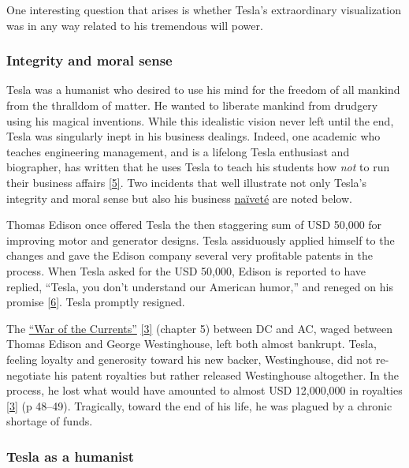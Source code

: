\documentclass[
  12pt,
  british,
  a4paper,
  rgb,
  dvipsnames,
  svgnames,
  hyphens]{article}
\begin{document}
One interesting question that arises is whether Tesla's extraordinary
visualization was in any way related to his tremendous will power.

\hypertarget{integrity-and-moral-sense}{%
\subsubsection{Integrity and moral
sense}\label{integrity-and-moral-sense}}

Tesla was a humanist who desired to use his mind for the freedom of all
mankind from the thralldom of matter. He wanted to liberate mankind from
drudgery using his magical inventions. While this idealistic vision
never left until the end, Tesla was singularly inept in his business
dealings. Indeed, one academic who teaches engineering management, and
is a lifelong Tesla enthusiast and biographer, has written that he uses
Tesla to teach his students how \emph{not} to run their business affairs
\protect\hyperlink{ref-lomas99}{{[}5{]}}. Two incidents that well
illustrate not only Tesla's integrity and moral sense but also his
business \href{https://www.thefreedictionary.com/naivete}{naïveté} are
noted below.

Thomas Edison once offered Tesla the then staggering sum of USD 50,000
for improving motor and generator designs. Tesla assiduously applied
himself to the changes and gave the Edison company several very
profitable patents in the process. When Tesla asked for the USD 50,000,
Edison is reported to have replied, ``Tesla, you don't understand our
American humor,'' and reneged on his promise
\protect\hyperlink{ref-tesla-wiki}{{[}6{]}}. Tesla promptly resigned.

The \href{https://en.wikipedia.org/wiki/War_of_the_currents}{``War of
the Currents''} \protect\hyperlink{ref-cheney81}{{[}3{]}} (chapter 5)
between DC and AC, waged between Thomas Edison and George Westinghouse,
left both almost bankrupt. Tesla, feeling loyalty and generosity toward
his new backer, Westinghouse, did not re-negotiate his patent royalties
but rather released Westinghouse altogether. In the process, he lost
what would have amounted to almost USD 12,000,000 in royalties
\protect\hyperlink{ref-cheney81}{{[}3{]}} (p 48--49). Tragically, toward
the end of his life, he was plagued by a chronic shortage of funds.

\hypertarget{tesla-as-a-humanist}{%
\subsubsection{Tesla as a humanist}\label{tesla-as-a-humanist}}
\end{document}
